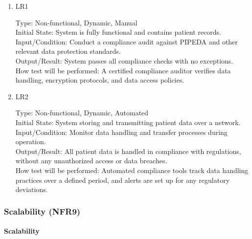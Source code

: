 \documentclass[12pt, titlepage]{article}
\begin{document}
\begin{enumerate}
    \item{LR1\\}
    
    Type: Non-functional, Dynamic, Manual\\
    
    Initial State: System is fully functional and contains patient records.\\
    
    Input/Condition: Conduct a compliance audit against PIPEDA and other relevant data protection standards.\\
    
    Output/Result: System passes all compliance checks with no exceptions.\\
    
    How test will be performed: A certified compliance auditor verifies data handling, encryption protocols, and data access policies.

    \item{LR2\\}
    
    Type: Non-functional, Dynamic, Automated\\
    
    Initial State: System storing and transmitting patient data over a network.\\
    
    Input/Condition: Monitor data handling and transfer processes during operation.\\
    
    Output/Result: All patient data is handled in compliance with regulations, without any unauthorized access or data breaches.\\
    
    How test will be performed: Automated compliance tools track data handling practices over a defined period, and alerts are set up for any regulatory deviations.
\end{enumerate}

\subsubsection{Scalability (NFR9)}

\paragraph{Scalability}
\end{document}
